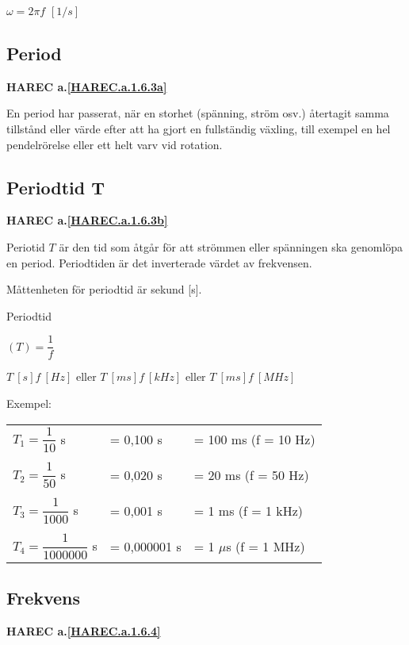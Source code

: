\(\omega= 2\pi f\) \([1/s]\)

\subsection{Period}
\textbf{HAREC a.\ref{HAREC.a.1.6.3a}\label{myHAREC.a.1.6.3a}}

En period har passerat, när en storhet (spänning, ström osv.) återtagit samma
tillstånd eller värde efter att ha gjort en fullständig växling, till exempel en hel
pendelrörelse eller ett helt varv vid rotation.

\subsection{Periodtid T}
\textbf{HAREC a.\ref{HAREC.a.1.6.3b}\label{myHAREC.a.1.6.3b}}

Periotid \(T\) är den tid som åtgår för att strömmen eller spänningen ska
genomlöpa en period. Periodtiden är det inverterade värdet av frekvensen.

Måttenheten för periodtid är sekund [s].

Periodtid

\((T) = \dfrac{1}{f}\)

\(T\ [s]  f\ [Hz]\) eller
\(T\ [ms] f\ [kHz]\) eller
\(T\ [ms] f\ [MHz]\)

Exempel:

\begin{center}
\begin{tabular}{lll}
\(T_1=\dfrac{1}{10}\) s & = 0,100 s & = 100 ms (f = 10 Hz)\\
\\
\(T_2=\dfrac{1}{50}\) s & = 0,020 s & = 20 ms (f = 50 Hz)\\
\\
\(T_3=\dfrac{1}{1000}\) s & = 0,001 s & = 1 ms (f = 1 kHz)\\
\\
\(T_4=\dfrac{1}{1000000}\) s & = 0,000001 s & = 1 \(\mu\)s (f = 1 MHz)\\
\end{tabular}
\end{center}

\subsection{Frekvens}
\textbf{HAREC a.\ref{HAREC.a.1.6.4}\label{myHAREC.a.1.6.4}}

